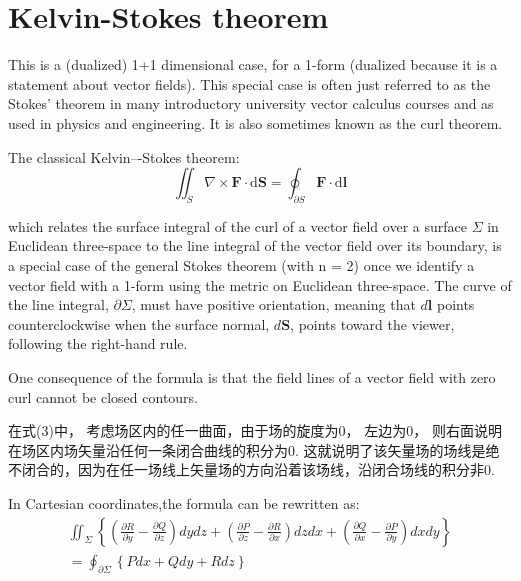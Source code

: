\documentclass[a4paper]{article}
\begin{document}
\section{Kelvin-Stokes theorem}
This is a (dualized) 1+1 dimensional case, for a 1-form (dualized because it is a statement about vector fields). This special case is often just referred to as the Stokes' theorem in many introductory university vector calculus courses and as used in physics and engineering. It is also sometimes known as the curl theorem.

The classical Kelvin–-Stokes theorem:
\begin{equation}
\iint_S \nabla\times \boldsymbol{F}\cdot \mathrm{d}\boldsymbol{S}=\oint_{\partial S}\boldsymbol{F}\cdot\mathrm{d}\boldsymbol{l}
\end{equation}

which relates the surface integral of the curl of a vector field over a surface $\Sigma$ in Euclidean three-space to the line integral of the vector field over its boundary, is a special case of the general Stokes theorem (with n = 2) once we identify a vector field with a 1-form using the metric on Euclidean three-space. 
The curve of the line integral, $\partial\Sigma$, must have positive orientation, meaning that $d\boldsymbol{l}$ points counterclockwise when the surface normal, $d\boldsymbol{S}$, points toward the viewer, following the right-hand rule.

One consequence of the formula is that the field lines of a vector field with zero curl cannot be closed contours.
\begin{CJK}{UTF8}{gbsn}
在式(3)中， 考虑场区内的任一曲面，由于场的旋度为0， 左边为0， 则右面说明在场区内场矢量沿任何一条闭合曲线的积分为0. 这就说明了该矢量场的场线是绝不闭合的，因为在任一场线上矢量场的方向沿着该场线，沿闭合场线的积分非0.
\end{CJK}

In Cartesian coordinates,the formula can be rewritten as:
\begin{equation}
\begin{split}
\iint_\Sigma \left\lbrace\left(\frac{\partial R}{\partial y}-\frac{\partial Q}{\partial z}\right) dydz + \left(\frac{\partial P}{\partial z}-\frac{\partial R}{\partial x}\right) dzdx + \left(\frac{\partial Q}{\partial x}-\frac{\partial P}{\partial y}\right) dxdy\right\rbrace\\
= \oint_{\partial\Sigma} \left\lbrace P dx + Q dy + R dz\right\rbrace
\end{split}
\end{equation}
\end{document}
